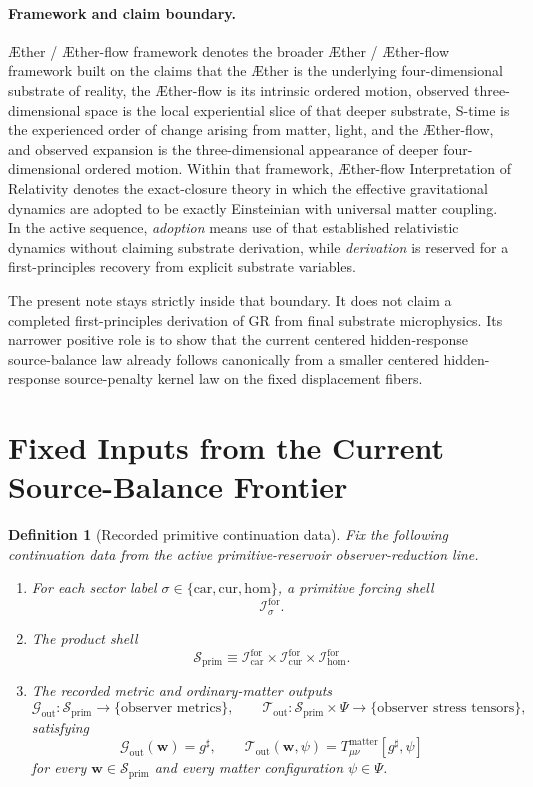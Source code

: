 \documentclass[11pt]{article}
\newcommand{\Aether}{\AE{}ther}
\newcommand{\Aflow}{\AE{}ther-flow}
\newcommand{\TheoryName}{\Aflow{} Interpretation of Relativity}
\newcommand{\TheoryProgram}{\Aether{} / \Aflow{} framework}
\newcommand{\CompletedMetric}{g^{\sharp}}
\newcommand{\MatterSpace}{\Psi}
\newcommand{\Car}{\mathrm{car}}
\newcommand{\Cur}{\mathrm{cur}}
\newcommand{\Hom}{\mathrm{hom}}
\newcommand{\ForSpace}[1]{\mathcal I_{#1}^{\mathrm{for}}}
\newcommand{\PrimShell}{\mathcal S_{\mathrm{prim}}}
\newcommand{\MetricOut}{\mathscr G_{\mathrm{out}}}
\newcommand{\MatterOut}{\mathscr T_{\mathrm{out}}}
\newtheorem{definition}{Definition}
\begin{document}
\paragraph{Framework and claim boundary.}
\TheoryProgram{} denotes the broader \Aether{} / \Aflow{} framework built on the claims that the \Aether{} is the underlying four-dimensional substrate of reality, the \Aflow{} is its intrinsic ordered motion, observed three-dimensional space is the local experiential slice of that deeper substrate, S-time is the experienced order of change arising from matter, light, and the \Aflow{}, and observed expansion is the three-dimensional appearance of deeper four-dimensional ordered motion. Within that framework, \TheoryName{} denotes the exact-closure theory in which the effective gravitational dynamics are adopted to be exactly Einsteinian with universal matter coupling. In the active sequence, \emph{adoption} means use of that established relativistic dynamics without claiming substrate derivation, while \emph{derivation} is reserved for a first-principles recovery from explicit substrate variables.

The present note stays strictly inside that boundary. It does not claim a completed first-principles derivation of GR from final substrate microphysics. Its narrower positive role is to show that the current centered hidden-response source-balance law already follows canonically from a smaller centered hidden-response source-penalty kernel law on the fixed displacement fibers.

\section{Fixed Inputs from the Current Source-Balance Frontier}

\begin{definition}[Recorded primitive continuation data]
\label{def:fixed}
Fix the following continuation data from the active primitive-reservoir observer-reduction line.
\begin{enumerate}
    \item For each sector label \(\sigma\in\{\Car,\Cur,\Hom\}\), a primitive forcing shell
    \[
    \ForSpace{\sigma}.
    \]
    \item The product shell
    \[
    \PrimShell
    \equiv
    \ForSpace{\Car}\times \ForSpace{\Cur}\times \ForSpace{\Hom}.
    \]
    \item The recorded metric and ordinary-matter outputs
    \[
    \MetricOut:\PrimShell\to\{\text{observer metrics}\},
    \qquad
    \MatterOut:\PrimShell\times\MatterSpace\to\{\text{observer stress tensors}\},
    \]
    satisfying
    \begin{equation}
    \MetricOut(\mathbf w)=\CompletedMetric,
    \qquad
    \MatterOut(\mathbf w,\psi)
    =
    T_{\mu\nu}^{\mathrm{matter}}[\CompletedMetric,\psi]
    \label{eq:fixedoutputs}
    \end{equation}
    for every \(\mathbf w\in\PrimShell\) and every matter configuration \(\psi\in\MatterSpace\).
\end{enumerate}
\end{definition}
\end{document}
